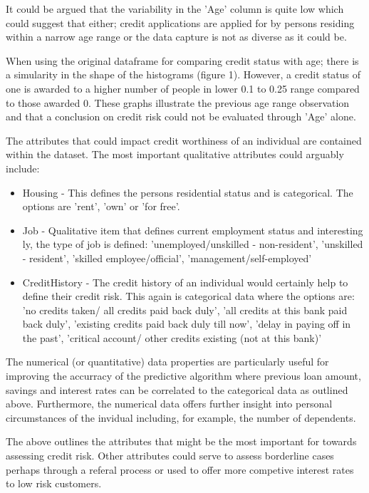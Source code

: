 \documentclass[a4paper]{article}
\begin{document}
It could be argued that the variability in the 'Age' column is quite low which could suggest that either; credit applications are applied for by persons residing within a narrow age range or the data capture is not as diverse as it could be.

When using the original dataframe for comparing credit status with age; there is a simularity in the shape of the histograms (figure 1).  However, a credit status of one is awarded to a higher number of people in lower 0.1 to 0.25 range compared to those awarded 0.  These graphs illustrate the previous age range observation and that a conclusion on credit risk could not be evaluated through 'Age' alone.

The attributes that could impact credit worthiness of an individual are contained within the dataset.  The most important qualitative attributes could arguably include:

\begin{itemize}
\item{Housing - This defines the persons residential status and is categorical. The options are 'rent', 'own' or 'for free'.}
\item{Job - Qualitative item that defines current employment status and interesting ly, the type of job is defined: 'unemployed/unskilled - non-resident', 'unskilled - resident', 'skilled employee/official', 'management/self-employed'}
\item{CreditHistory - The credit history of an individual would certainly help to define their credit risk.  This again is categorical data where the options are: 'no credits taken/ all credits paid back duly', 'all credits at this bank paid back duly', 'existing credits paid back duly till now', 'delay in paying off in the past', 'critical account/ other credits existing (not at this bank)'}
\end{itemize}

The numerical (or quantitative) data properties are particularly useful for improving the accurracy of the predictive algorithm where previous loan amount, savings and interest rates can be correlated to the categorical data as outlined above.  Furthermore, the numerical data offers further insight into personal circumstances of the invidual including, for example, the number of dependents. 

The above outlines the attributes that might be the most important for towards assessing credit risk.  Other attributes could serve to assess borderline cases perhaps through a referal process or used to offer more competive interest rates to low risk customers.
   
\end{document}
